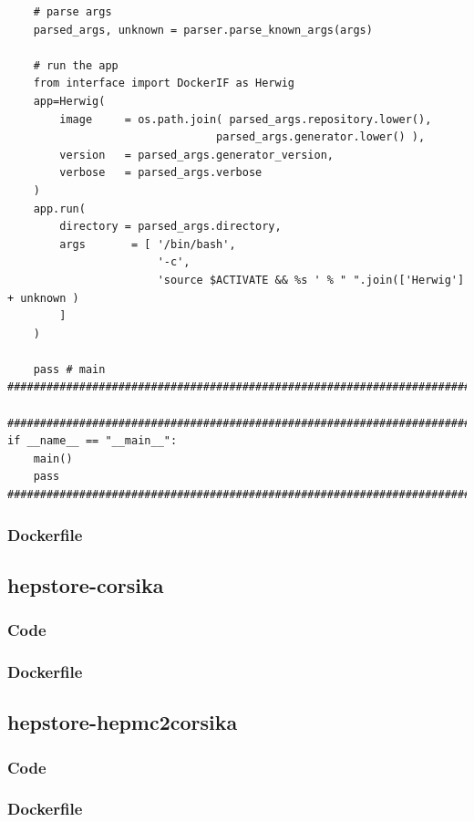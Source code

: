 \documentclass[aps,prd,11pt,tightenlines,superscriptaddress,nofootinbib,preprintnumbers,notitlepage]{revtex4-1}
\begin{document}
\begin{appendix}
\begin{lstlisting}
    # parse args
    parsed_args, unknown = parser.parse_known_args(args)
            
    # run the app
    from interface import DockerIF as Herwig
    app=Herwig(
        image     = os.path.join( parsed_args.repository.lower(),
                                parsed_args.generator.lower() ),
        version   = parsed_args.generator_version,
        verbose   = parsed_args.verbose
    )
    app.run(
        directory = parsed_args.directory,
        args       = [ '/bin/bash',
                       '-c',
                       'source $ACTIVATE && %s ' % " ".join(['Herwig'] + unknown )
        ]
    )
        
    pass # main
############################################################################

############################################################################
if __name__ == "__main__":
    main()
    pass
############################################################################
  \end{lstlisting}

  \subsubsection{Dockerfile}
  
  \subsection{hepstore-corsika}

  \subsubsection{Code}

  \subsubsection{Dockerfile}
  
  \subsection{hepstore-hepmc2corsika}

  \subsubsection{Code}

  \subsubsection{Dockerfile}

\end{appendix}
\end{document}
